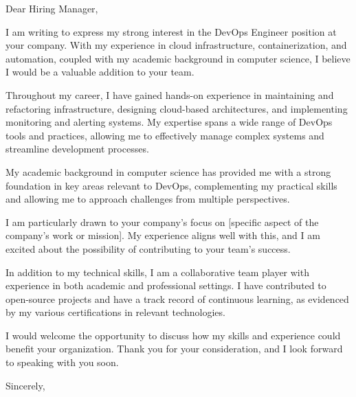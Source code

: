 \documentclass[]{main}
\begin{document}
\begin{letter}{}
    \vspace*{-15\baselineskip}

    \opening{Dear Hiring Manager,}
    \vspace{1em}

    I am writing to express my strong interest in the DevOps Engineer position at your company. With my experience in cloud infrastructure, containerization, and automation, coupled with my academic background in computer science, I believe I would be a valuable addition to your team.

    Throughout my career, I have gained hands-on experience in maintaining and refactoring infrastructure, designing cloud-based architectures, and implementing monitoring and alerting systems. My expertise spans a wide range of DevOps tools and practices, allowing me to effectively manage complex systems and streamline development processes.

    My academic background in computer science has provided me with a strong foundation in key areas relevant to DevOps, complementing my practical skills and allowing me to approach challenges from multiple perspectives.

    I am particularly drawn to your company's focus on [specific aspect of the company's work or mission]. My experience aligns well with this, and I am excited about the possibility of contributing to your team's success.

    In addition to my technical skills, I am a collaborative team player with experience in both academic and professional settings. I have contributed to open-source projects and have a track record of continuous learning, as evidenced by my various certifications in relevant technologies.

    I would welcome the opportunity to discuss how my skills and experience could benefit your organization. Thank you for your consideration, and I look forward to speaking with you soon.

    \vspace{3em}
    \closing{Sincerely,\\\name}
\end{letter}
\end{document}
